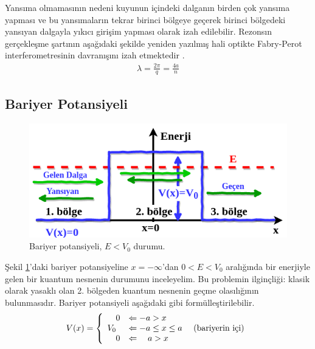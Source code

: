 \documentclass[a4paper,12pt, twoside]{article}
\begin{document}
Yansıma olmamasının nedeni kuyunun içindeki dalganın birden çok yansıma yapması ve bu yansımaların tekrar birinci bölgeye geçerek birinci bölgedeki yansıyan dalgayla yıkıcı girişim yapması olarak izah edilebilir. Rezonsın gerçekleşme şartının
aşağıdaki şekilde yeniden yazılmış hali optikte Fabry-Perot interferometresinin davranışını izah etmektedir \cite{book:Gasiorowicz}.
\begin{align}
\lambda=\frac{2 \pi}{q}=\frac{4 a}{n}
\end{align}

\subsection{Bariyer Potansiyeli}
\begin{figure}[hbtp]
	\centering
	\includegraphics[width=0.62\linewidth]{figurler/Bariyer_Potansiyeli.png}
	\caption{Bariyer potansiyeli, $E<V_0$ durumu.}
	\label{fig:bariyerpotansiyeli}
\end{figure}
Şekil \ref{fig:bariyerpotansiyeli}'daki bariyer potansiyeline $x=-\infty$'dan $0<E<V_0$ aralığında bir enerjiyle gelen bir kuantum nesnenin durumunu inceleyelim. Bu problemin ilginçliği: klasik olarak yasaklı olan 2. bölgeden kuantum nesnenin geçme olasılığının bulunmasıdır. Bariyer potansiyeli aşağıdaki gibi formülleştirilebilir.
\begin{align}
V ( x )  = \left\{ 
\begin{array} { l l } 
{ \quad 0 } & {\Leftarrow -a > x } \\
{V _ { 0 } } & {\Leftarrow -a \leq x \leq a } \quad \text{ (bariyerin içi)} \\
{ \quad 0 } & {\Leftarrow \quad a > x }
\end{array} \right. 
\end{align}
\end{document}
